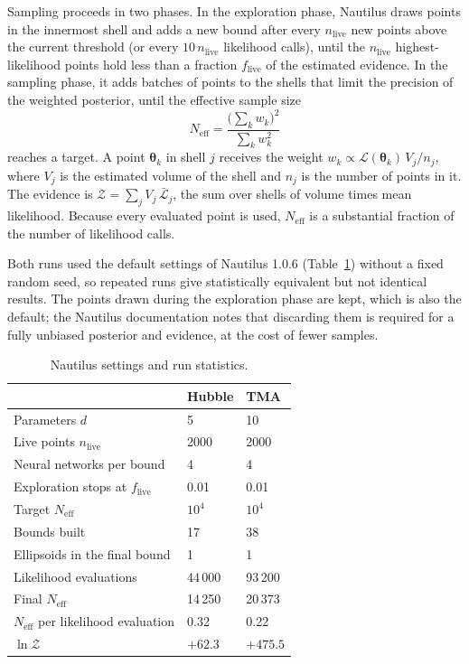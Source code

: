 Sampling proceeds in two phases. In the exploration phase, Nautilus draws points in the innermost shell and adds a new bound after every $n_{\mathrm{live}}$ new points above the current threshold (or every $10\,n_{\mathrm{live}}$ likelihood calls), until the $n_{\mathrm{live}}$ highest-likelihood points hold less than a fraction $f_{\mathrm{live}}$ of the estimated evidence. In the sampling phase, it adds batches of points to the shells that limit the precision of the weighted posterior, until the effective sample size
\begin{equation}
N_{\mathrm{eff}} = \frac{\bigl(\sum_k w_k\bigr)^2}{\sum_k w_k^2}
\end{equation}
reaches a target. A point $\boldsymbol{\theta}_k$ in shell $j$ receives the weight $w_k\propto\mathcal{L}(\boldsymbol{\theta}_k)\,V_j/n_j$, where $V_j$ is the estimated volume of the shell and $n_j$ is the number of points in it. The evidence is $\mathcal{Z}=\sum_j V_j\,\bar{\mathcal{L}}_j$, the sum over shells of volume times mean likelihood. Because every evaluated point is used, $N_{\mathrm{eff}}$ is a substantial fraction of the number of likelihood calls.

Both runs used the default settings of Nautilus 1.0.6 (Table~\ref{tab:nautilus}) without a fixed random seed, so repeated runs give statistically equivalent but not identical results. The points drawn during the exploration phase are kept, which is also the default; the Nautilus documentation notes that discarding them is required for a fully unbiased posterior and evidence, at the cost of fewer samples.

\begin{table}
\centering
\caption{Nautilus settings and run statistics.}
\label{tab:nautilus}
\begin{tabular}{lll}
\hline
 & Hubble & TMA \\
\hline
Parameters $d$ & 5 & 10 \\
Live points $n_{\mathrm{live}}$ & 2000 & 2000 \\
Neural networks per bound & 4 & 4 \\
Exploration stops at $f_{\mathrm{live}}$ & 0.01 & 0.01 \\
Target $N_{\mathrm{eff}}$ & $10^4$ & $10^4$ \\
Bounds built & 17 & 38 \\
Ellipsoids in the final bound & 1 & 1 \\
Likelihood evaluations & 44\,000 & 93\,200 \\
Final $N_{\mathrm{eff}}$ & 14\,250 & 20\,373 \\
$N_{\mathrm{eff}}$ per likelihood evaluation & 0.32 & 0.22 \\
$\ln\mathcal{Z}$ & $+62.3$ & $+475.5$ \\
\hline
\end{tabular}
\end{table}


